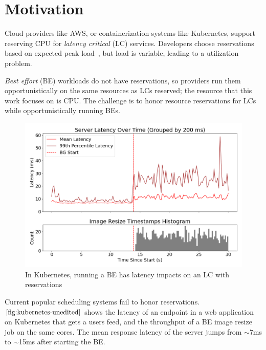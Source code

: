 \section{Motivation}

Cloud providers like AWS, or containerization systems like Kubernetes, support
reserving CPU for \textit{latency critical} (LC) services. Developers choose
reservations based on expected peak load~\cite{borg, nu, overprovision}, but
load is variable, leading to a utilization problem. 

\textit{Best effort} (BE) workloads do not have reservations, so providers run
them opportunistically on the same resources as LCs reserved; the resource that
this work focuses on is CPU. The challenge is to honor resource reservations for
LCs while opportunistically running BEs.

\begin{figure}[t]
    \centering
    \includegraphics[width=\columnwidth]{graphs/kubernetes-unedited.png}
    \caption{In Kubernetes, running a BE has latency impacts on an LC with
    reservations}\label{fig:kubernetes-unedited}
\end{figure}

Current popular scheduling systems fail to honor reservations.
$\autoref{fig:kubernetes-unedited}$ shows the latency of an endpoint in a web
application on Kubernetes that gets a users feed, and the throughput of a BE
image resize job on the same cores. The mean response latency of the server
jumps from $\sim$7ms to $\sim$15ms after starting the BE.



